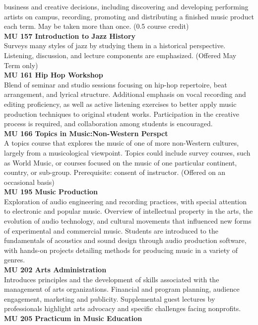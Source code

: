 \documentclass[
  letterpaper,
]{scrbook}
\begin{document}
business and creative decisions, including discovering and developing
performing artists on campus, recording, promoting and distributing a
finished music product each term. May be taken more than once. (0.5
course credit)\\
\textbf{MU 157 Introduction to Jazz History}\\
Surveys many styles of jazz by studying them in a historical
perspective. Listening, discussion, and lecture components are
emphasized. (Offered May Term only)\\
\textbf{MU 161 Hip Hop Workshop}\\
Blend of seminar and studio sessions focusing on hip-hop repertoire,
beat arrangement, and lyrical structure. Additional emphasis on vocal
recording and editing proficiency, as well as active listening exercises
to better apply music production techniques to original student works.
Participation in the creative process is required, and collaboration
among students is encouraged.\\
\textbf{MU 166 Topics in Music:Non-Western Perspct}\\
A topics course that explores the music of one of more non-Western
cultures, largely from a musicological viewpoint. Topics could include
survey courses, such as World Music, or courses focused on the music of
one particular continent, country, or sub-group. Prerequisite: consent
of instructor. (Offered on an occasional basis)\\
\textbf{MU 195 Music Production}\\
Exploration of audio engineering and recording practices, with special
attention to electronic and popular music. Overview of intellectual
property in the arts, the evolution of audio technology, and cultural
movements that influenced new forms of experimental and commercial
music. Students are introduced to the fundamentals of acoustics and
sound design through audio production software, with hands-on projects
detailing methods for producing music in a variety of genres.\\
\textbf{MU 202 Arts Administration}\\
Introduces principles and the development of skills associated with the
management of arts organizations. Financial and program planning,
audience engagement, marketing and publicity. Supplemental guest
lectures by professionals highlight arts advocacy and specific
challenges facing nonprofits.\\
\textbf{MU 205 Practicum in Music Education}\\
\end{document}
